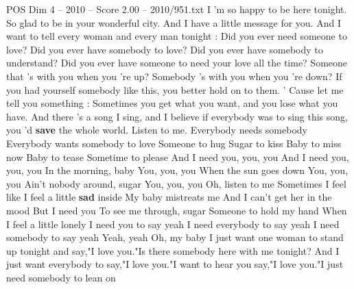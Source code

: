 \begin{textsample}{POS Dim 4 – 2010 – Score 2.00 – 2010/951.txt}  \label{ex:f4_pos_037}
I 'm so happy to be here tonight.
So glad to be in your wonderful city.
And I have a little message for you.
And I want to tell every woman and every man tonight : Did you ever need someone to love?
Did you ever have somebody to love?
Did you ever have somebody to understand?
Did you ever have someone to need your love all the time?
Someone that 's with you when you 're up?
Somebody 's with you when you 're down?
If you had yourself somebody like this, you better hold on to them. ' Cause let me tell you something : Sometimes you get what you want, and you lose what you have.
And there 's a song I sing, and I believe if everybody was to sing this song, you 'd \textbf{save} the whole world.
Listen to me.
Everybody needs somebody Everybody wants somebody to love Someone to hug Sugar to kiss Baby to miss now Baby to tease Sometime to please And I need you, you, you And I need you, you, you In the morning, baby You, you, you When the sun goes down You, you, you Ain't nobody around, sugar You, you, you Oh, listen to me Sometimes I feel like I feel a little \textbf{sad} inside My baby mistreats me And I can't get her in the mood But I need you To see me through, sugar Someone to hold my hand When I feel a little lonely I need you to say yeah I need everybody to say yeah I need somebody to say yeah Yeah, yeah Oh, my baby I just want one woman to stand up tonight and say,"I love you."Is there somebody here with me tonight?
And I just want everybody to say,"I love you."I want to hear you say,"I love you."I just need somebody to lean on

\end{textsample}
